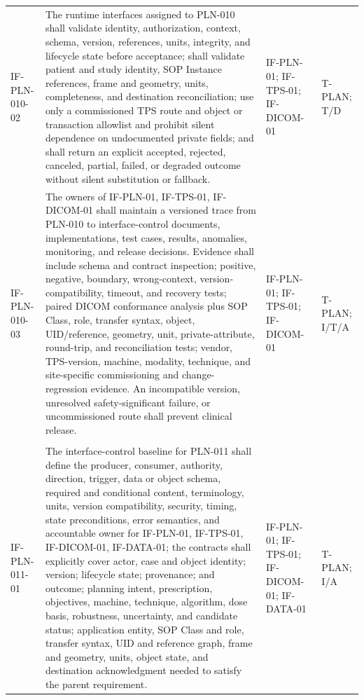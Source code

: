 \documentclass[11pt,letterpaper]{article}
\begin{document}
\begin{scriptsize}
\begin{longtable}{@{}L{0.14\textwidth}L{0.49\textwidth}L{0.19\textwidth}L{0.10\textwidth}@{}}
\addlinespace[2pt]
\mbox{IF-PLN-010-02} & The runtime interfaces assigned to PLN-010 shall validate identity, authorization, context, schema, version, references, units, integrity, and lifecycle state before acceptance; shall validate patient and study identity, SOP Instance references, frame and geometry, units, completeness, and destination reconciliation; use only a commissioned TPS route and object or transaction allowlist and prohibit silent dependence on undocumented private fields; and shall return an explicit accepted, rejected, canceled, partial, failed, or degraded outcome without silent substitution or fallback. & IF-PLN-01; IF-TPS-01; IF-DICOM-01 & T-PLAN; T\slash\allowbreak{}D \\
\addlinespace[2pt]
\mbox{IF-PLN-010-03} & The owners of IF-PLN-01, IF-TPS-01, IF-DICOM-01 shall maintain a versioned trace from PLN-010 to interface-control documents, implementations, test cases, results, anomalies, monitoring, and release decisions. Evidence shall include schema and contract inspection; positive, negative, boundary, wrong-context, version-compatibility, timeout, and recovery tests; paired DICOM conformance analysis plus SOP Class, role, transfer syntax, object, UID\slash\allowbreak{}reference, geometry, unit, private-attribute, round-trip, and reconciliation tests; vendor, TPS-version, machine, modality, technique, and site-specific commissioning and change-regression evidence. An incompatible version, unresolved safety-significant failure, or uncommissioned route shall prevent clinical release. & IF-PLN-01; IF-TPS-01; IF-DICOM-01 & T-PLAN; I\slash\allowbreak{}T\slash\allowbreak{}A \\
\addlinespace[2pt]
 \\
\addlinespace[2pt]
\mbox{IF-PLN-011-01} & The interface-control baseline for PLN-011 shall define the producer, consumer, authority, direction, trigger, data or object schema, required and conditional content, terminology, units, version compatibility, security, timing, state preconditions, error semantics, and accountable owner for IF-PLN-01, IF-TPS-01, IF-DICOM-01, IF-DATA-01; the contracts shall explicitly cover actor, case and object identity; version; lifecycle state; provenance; and outcome; planning intent, prescription, objectives, machine, technique, algorithm, dose basis, robustness, uncertainty, and candidate status; application entity, SOP Class and role, transfer syntax, UID and reference graph, frame and geometry, units, object state, and destination acknowledgment needed to satisfy the parent requirement. & IF-PLN-01; IF-TPS-01; IF-DICOM-01; IF-DATA-01 & T-PLAN; I\slash\allowbreak{}A \\

\end{longtable}
\end{scriptsize}
\end{document}

